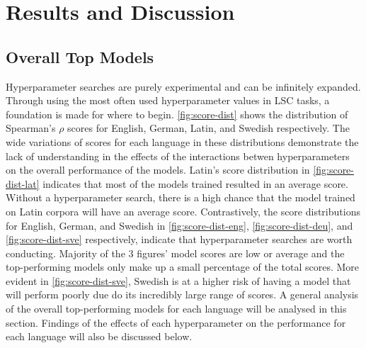 \section{Results and Discussion}
\label{sec:results}

\subsection{Overall Top Models}

Hyperparameter searches are purely experimental and can be infinitely expanded. Through using the most often used hyperparameter values in LSC tasks, a foundation is made for where to begin. \autoref{fig:score-dist} shows the distribution of Spearman's $\rho$ scores for English, German, Latin, and Swedish respectively. The wide variations of scores for each language in these distributions demonstrate the lack of understanding in the effects of the interactions betwen hyperparameters on the overall performance of the models. Latin's score distribution in \autoref{fig:score-dist-lat} indicates that most of the models trained resulted in an average score. Without a hyperparameter search, there is a high chance that the model trained on Latin corpora will have an average score. Contrastively, the score distributions for English, German, and Swedish in  \autoref{fig:score-dist-eng}, \autoref{fig:score-dist-deu}, and \autoref{fig:score-dist-sve} respectively, indicate that hyperparameter searches are worth conducting. Majority of the 3 figures' model scores are low or average and the top-performing models only make up a small percentage of the total scores. More evident in \autoref{fig:score-dist-sve}, Swedish is at a higher risk of having a model that will perform poorly due do its incredibly large range of scores. A general analysis of the overall top-performing models for each language will be analysed in this section. Findings of the effects of each hyperparameter on the performance for each language will also be discussed below. 

